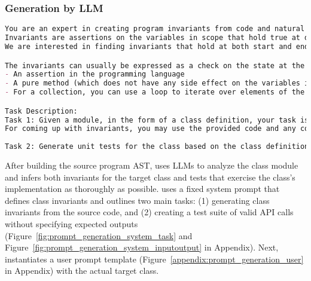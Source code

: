 \subsubsection{Generation by LLM}
\label{sec:llm}

\begin{figure*}[htp]
\begin{lstlisting}[language=markdown]
You are an expert in creating program invariants from code and natural language.
Invariants are assertions on the variables in scope that hold true at different program points
We are interested in finding invariants that hold at both start and end of a function within a data structure. Such an invariant is commonly known as an object invariant.  

The invariants can usually be expressed as a check on the state at the particular program point. The check should be expressed as a check in the same underlying programming language which evaluates to true or false. To express these, you can use:
- An assertion in the programming language
- A pure method (which does not have any side effect on the variables in scope) that checks one or more assertion
- For a collection, you can use a loop to iterate over elements of the collection and assert something on each element or a pair of elements.  

Task Description: 
Task 1: Given a module, in the form of a class definition, your task is to infer object invariants about the class. For doing so, you may examine how the methods of the class read and modify the various fields of the class. 
For coming up with invariants, you may use the provided code and any comments in the code. You may also use world knowledge to guide the search for invariants. 
 
Task 2: Generate unit tests for the class based on the class definition and public API methods. The test cases should simulate a series of public method calls to verify the behavior of the class, but do not use any testing framework like gtest. Do not add `assert` or any form of assertions.
\end{lstlisting}
    \caption{\tech Generation system prompt: instruction and task description.}
    \label{fig:prompt_generation_system_task}
\end{figure*}


After building the source program AST, \tech uses LLMs to analyze the class module and infers both invariants for the target class and tests that exercise the class’s implementation as thoroughly as possible. \tech uses a fixed system prompt that defines class invariants and outlines two main tasks: (1) generating class invariants from the source code, and (2) creating a test suite of valid API calls without specifying expected outputs (Figure~\ref{fig:prompt_generation_system_task} and Figure~\ref{fig:prompt_generation_system_inputoutput} in Appendix).
Next, \tech instantiates a user prompt template (Figure~\ref{appendix:prompt_generation_user} in Appendix) with the actual target class.

